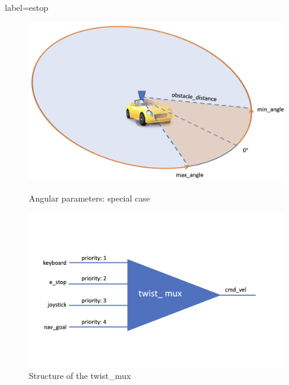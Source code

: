 \documentclass[numberofslides]{AMSBeamer}
\begin{document}
\begin{frame}{label=estop}
\begin{minipage}{0.6\textwidth}
\begin{center}
\begin{figure}
\begin{overprint}
                \includegraphics[width=\textwidth]{Presentations/LaTeX/images/estop-ausnahmefall.jpeg}
                    \caption{Angular parameters: special case}
                \includegraphics[width=\textwidth]{Presentations/LaTeX/images/twist_mux.jpeg}
                    \caption{Structure of the twist\_mux}
                    \label{fig:tmux}
            \end{overprint}
            
        \end{figure}
    \end{center}
    \end{minipage}
\end{frame}

\end{document}
